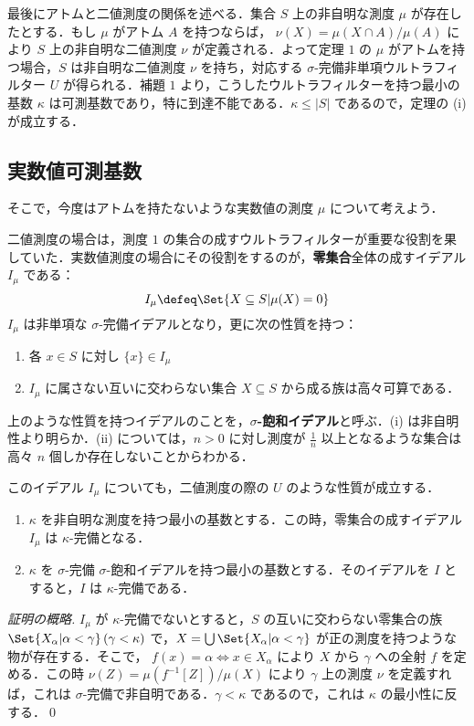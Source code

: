 \documentclass[a4j,uplatex]{jsarticle}
\begin{document}
最後にアトムと二値測度の関係を述べる．集合 $S$ 上の非自明な測度 $\mu$ が存在したとする．もし $\mu$ がアトム $A$ を持つならば， $\nu(X) = \mu(X \cap A)/\mu(A)$ により $S$ 上の非自明な二値測度 $\nu$ が定義される．よって定理 $1$ の $\mu$ がアトムを持つ場合，$S$ は非自明な二値測度 $\nu$ を持ち，対応する $\sigma$-完備非単項ウルトラフィルター $U$ が得られる．補題 $1$ より，こうしたウルトラフィルターを持つ最小の基数 $\kappa$ は可測基数であり，特に到達不能である．$\kappa \leq |S|$ であるので，定理の (i) が成立する．

\subsection{実数値可測基数}
そこで，今度はアトムを持たないような実数値の測度 $\mu$ について考えよう．

二値測度の場合は，測度 $1$ の集合の成すウルトラフィルターが重要な役割を果していた．実数値測度の場合にその役割をするのが，{\bfseries 零集合}全体の成すイデアル $I_\mu$ である：
\[
 I_\mu \defeq \Set{X \subseteq S | \mu(X) = 0}
\]
$I_\mu$ は非単項な $\sigma$-完備イデアルとなり，更に次の性質を持つ：

\begin{enumerate}[label=(\roman*)]
 \item 各 $x \in S$ に対し $\{x\} \in I_\mu$
       \label{Def:saturate:non-principal}
 \item $I_\mu$ に属さない互いに交わらない集合 $X \subseteq S$ から成る族は高々可算である．
       \label{Def:saturate:disj}
\end{enumerate}

上のような性質を持つイデアルのことを，{\bfseries $\sigma$-飽和イデアル}と呼ぶ．(i) は非自明性より明らか．(ii) については，$n > 0$ に対し測度が $\frac{1}{n}$ 以上となるような集合は高々 $n$ 個しか存在しないことからわかる．

このイデアル $I_\mu$ についても，二値測度の際の $U$ のような性質が成立する．

\begin{lemma}
 \begin{enumerate}[label=(\roman*)]
  \item $\kappa$ を非自明な測度を持つ最小の基数とする．この時，零集合の成すイデアル $I_\mu$ は $\kappa$-完備となる．
  \item $\kappa$ を $\sigma$-完備 $\sigma$-飽和イデアルを持つ最小の基数とする．そのイデアルを $I$ とすると，$I$ は $\kappa$-完備である．
 \end{enumerate}
\end{lemma}
\begin{proof}[証明の概略]
 $I_\mu$ が $\kappa$-完備でないとすると，$S$ の互いに交わらない零集合の族 $\Set{X_\alpha | \alpha < \gamma}\,(\gamma < \kappa)$ で，$X = \bigcup \Set{X_\alpha | \alpha < \gamma}$ が正の測度を持つような物が存在する．そこで，
 $f(x) = \alpha \Leftrightarrow x \in X_\alpha$
 により $X$ から $\gamma$ への全射 $f$ を定める．この時 $\nu(Z) = \mu(f^{-1}[Z])/\mu(X)$ により $\gamma$ 上の測度 $\nu$ を定義すれば，これは $\sigma$-完備で非自明である．$\gamma < \kappa$ であるので，これは $\kappa$ の最小性に反する．\qed
\end{proof}
\end{document}
